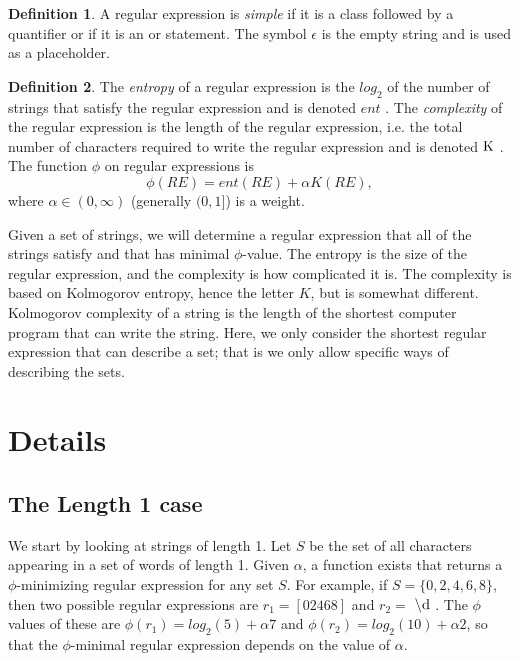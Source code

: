 \documentclass[11pt, oneside]{article}   	%
\theoremstyle{definition}
\newtheorem{definition}{Definition}
\newcommand{\dre}{$\backslash \textnormal{d}$ }
\newcommand{\K}{$ \textnormal{K}$ }
\newcommand{\entropy}{$ent$ }
\begin{document}
\begin{definition}
A regular expression is \textit{simple} if it is a class followed by a quantifier or if it is an or statement. 
The symbol $\epsilon$ is the empty string and is used as a placeholder.
\end{definition}

\begin{definition}
The \textit{entropy} of a regular expression is the $log_2$ of the number of strings that satisfy the regular expression and is denoted \entropy. The \textit{complexity} of the regular expression is the length of the regular expression, i.e. the total number of characters required to  write the regular expression and is denoted \K. 
The function $\phi$ on regular expressions is 
\begin{equation}
\phi(RE) = ent(RE) +\alpha K(RE),
\end{equation}
where $\alpha\in(0,\infty)$ (generally $(0,1]$) is a weight.
\end{definition}

Given a set of strings, we will determine a regular expression that all of the strings satisfy and that has minimal $\phi$-value. 
The entropy is the size of the regular expression, and the complexity is how complicated it is. 
The complexity is based on Kolmogorov entropy, hence the letter $K$, but is somewhat different. 
Kolmogorov complexity of a string is the length of the shortest computer program that can write the string. 
Here, we only consider the shortest regular expression that can describe a set; that is we only allow specific ways of describing the sets. 


\section{Details}

\subsection{The Length 1 case}

We start by looking at strings of length 1. Let  $S$ be the set of all characters appearing in a set of words of length 1. 
Given $\alpha$, a function exists that returns a $\phi$-minimizing regular expression for any set $S$. 
For example, if $S = \{0,2,4,6,8\}$, then two possible regular expressions are $r_1 = [02468]$ and $r_2 = $ \dre. 
The $\phi$ values of these are $\phi(r_1) = log_2(5) + \alpha 7$ and $\phi(r_2) = log_2(10) + \alpha 2$, 
so that the $\phi$-minimal regular expression depends on the value of $\alpha$. 
\end{document}
